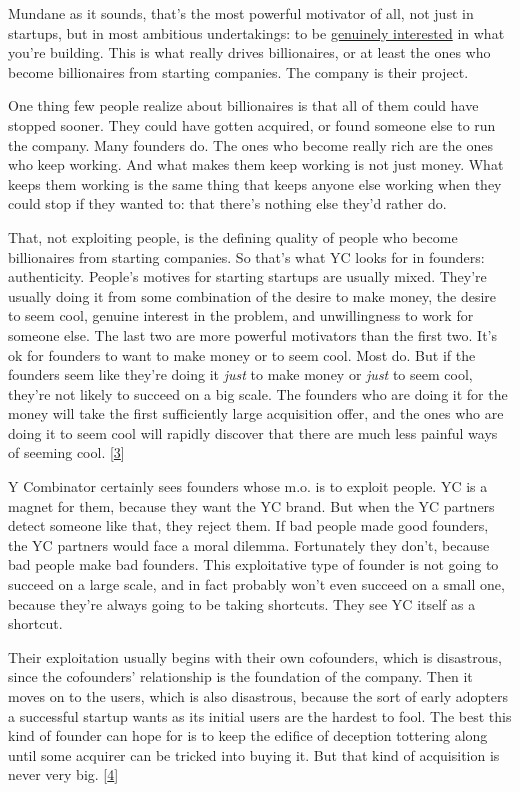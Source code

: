 Mundane as it sounds, that's the most powerful motivator of all, not
just in startups, but in most ambitious undertakings: to be
\href{genius.html}{genuinely interested} in what you're building. This
is what really drives billionaires, or at least the ones who become
billionaires from starting companies. The company is their project.

One thing few people realize about billionaires is that all of them
could have stopped sooner. They could have gotten acquired, or found
someone else to run the company. Many founders do. The ones who become
really rich are the ones who keep working. And what makes them keep
working is not just money. What keeps them working is the same thing
that keeps anyone else working when they could stop if they wanted to:
that there's nothing else they'd rather do.

That, not exploiting people, is the defining quality of people who
become billionaires from starting companies. So that's what YC looks for
in founders: authenticity. People's motives for starting startups are
usually mixed. They're usually doing it from some combination of the
desire to make money, the desire to seem cool, genuine interest in the
problem, and unwillingness to work for someone else. The last two are
more powerful motivators than the first two. It's ok for founders to
want to make money or to seem cool. Most do. But if the founders seem
like they're doing it \emph{just} to make money or \emph{just} to seem
cool, they're not likely to succeed on a big scale. The founders who are
doing it for the money will take the first sufficiently large
acquisition offer, and the ones who are doing it to seem cool will
rapidly discover that there are much less painful ways of seeming cool.
{[}\hyperref[f3n]{3}{]}

Y Combinator certainly sees founders whose m.o. is to exploit people. YC
is a magnet for them, because they want the YC brand. But when the YC
partners detect someone like that, they reject them. If bad people made
good founders, the YC partners would face a moral dilemma. Fortunately
they don't, because bad people make bad founders. This exploitative type
of founder is not going to succeed on a large scale, and in fact
probably won't even succeed on a small one, because they're always going
to be taking shortcuts. They see YC itself as a shortcut.

Their exploitation usually begins with their own cofounders, which is
disastrous, since the cofounders' relationship is the foundation of the
company. Then it moves on to the users, which is also disastrous,
because the sort of early adopters a successful startup wants as its
initial users are the hardest to fool. The best this kind of founder can
hope for is to keep the edifice of deception tottering along until some
acquirer can be tricked into buying it. But that kind of acquisition is
never very big. {[}\hyperref[f4n]{4}{]}

